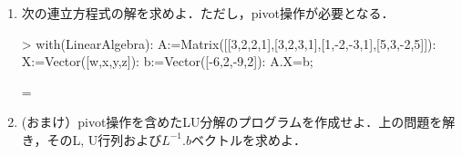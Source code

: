 \begin{enumerate}
\item 次の連立方程式の解を求めよ．ただし，pivot操作が必要となる．
\begin{MapleInput}
> with(LinearAlgebra): 
  A:=Matrix([[3,2,2,1],[3,2,3,1],[1,-2,-3,1],[5,3,-2,5]]):
  X:=Vector([w,x,y,z]): 
  b:=Vector([-6,2,-9,2]): 
  A.X=b;
\end{MapleInput}
\begin{MapleOutput}
\left[ \begin {array}{c} 3\,w+2\,x+2\,y+z\\ 3\,w+2\,x+3\,y+z\\ w-2\,x-3\,y+z\\ 5\,w+3\,x-2\,y+5\,z\end {array} \right] = \left[ \begin {array}{c} -6\\ 2\\ -9\\ 2\end {array} \right]
\end{MapleOutput}
\item (おまけ）pivot操作を含めたLU分解のプログラムを作成せよ．上の問題を解き，そのL, U行列および$L^{-1}.b$ベクトルを求めよ．
\end{enumerate}